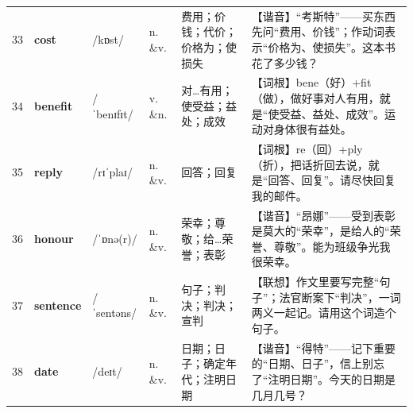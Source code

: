 \documentclass[UTF8,a4paper,11pt,oneside]{ctexbook}
\newcommand{\cellword}[1]{{\bfseries\textcolor{wordcol}{#1}}}
\newcommand{\cellipa}[1]{{\footnotesize\textcolor{ipacol}{#1}}}
\newcommand{\cellpos}[1]{\textcolor{poscol}{#1}}
\newcommand{\cellno}[1]{\textcolor{volcolor!75!black}{#1}}
\begin{document}
{\begin{longtable}{@{}C{0.045\textwidth}L{0.155\textwidth}L{0.175\textwidth}C{0.070\textwidth}L{0.180\textwidth}L{0.282\textwidth}@{}}
 \cellno{33} & \cellword{cost} & \cellipa{/kɒst/} & \cellpos{n. \&v.} & 费用；价钱；代价；价格为；使损失 & \textcolor{tagSound}{【谐音】}“考斯特”——买东西先问“费用、价钱”；作动词表示“价格为、使损失”。这本书花了多少钱？ \\
\cellno{34} & \cellword{benefit} & \cellipa{/ˈbenɪfɪt/} & \cellpos{v. \&n.} & 对…有用；使受益；益处；成效 & \textcolor{tagRoot}{【词根】}bene（好）+fit（做），做好事对人有用，就是“使受益、益处、成效”。运动对身体很有益处。 \\
 \cellno{35} & \cellword{reply} & \cellipa{/rɪˈplaɪ/} & \cellpos{n. \&v.} & 回答；回复 & \textcolor{tagRoot}{【词根】}re（回）+ply（折），把话折回去说，就是“回答、回复”。请尽快回复我的邮件。 \\
\cellno{36} & \cellword{honour} & \cellipa{/ˈɒnə(r)/} & \cellpos{n. \&v.} & 荣幸；尊敬；给…荣誉；表彰 & \textcolor{tagSound}{【谐音】}“昂娜”——受到表彰是莫大的“荣幸”，是给人的“荣誉、尊敬”。能为班级争光我很荣幸。 \\
 \cellno{37} & \cellword{sentence} & \cellipa{/ˈsentəns/} & \cellpos{n. \&v.} & 句子；判决；判决；宣判 & \textcolor{tagAssoc}{【联想】}作文里要写完整“句子”；法官断案下“判决”，一词两义一起记。请用这个词造个句子。 \\
\cellno{38} & \cellword{date} & \cellipa{/deɪt/} & \cellpos{n. \&v.} & 日期；日子；确定年代；注明日期 & \textcolor{tagSound}{【谐音】}“得特”——记下重要的“日期、日子”，信上别忘了“注明日期”。今天的日期是几月几号？ \\
\end{longtable}
}

\end{document}
